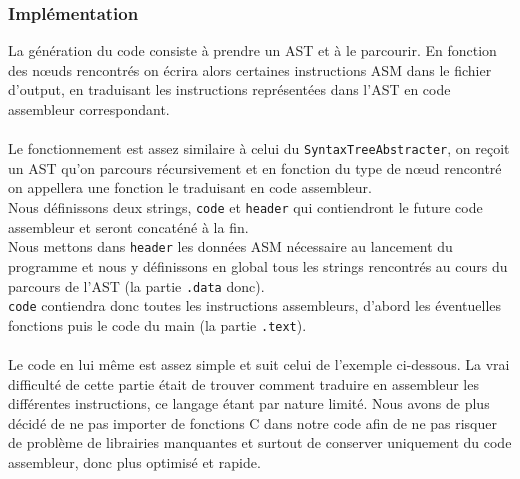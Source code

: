 \documentclass[a4paper,10pt]{article}
\begin{document}
	\subsubsection{Implémentation}
	La génération du code consiste à prendre un AST et à le parcourir. En fonction des nœuds rencontrés on écrira alors certaines instructions ASM dans le fichier d'output, en traduisant les instructions représentées dans l'AST en code assembleur correspondant.\\
	~\\
	Le fonctionnement est assez similaire à celui du \verb?SyntaxTreeAbstracter?, on reçoit un AST qu'on parcours récursivement et en fonction du type de nœud rencontré on appellera une fonction le traduisant en code assembleur.\\
	Nous définissons deux strings, \verb?code? et \verb?header? qui contiendront le future code assembleur et seront concaténé à la fin.\\
	Nous mettons dans \verb?header? les données ASM nécessaire au lancement du programme et nous y définissons en global tous les strings rencontrés au cours du parcours de l'AST (la partie \verb?.data? donc).\\
	\verb?code? contiendra donc toutes les instructions assembleurs, d'abord les éventuelles fonctions puis le code du main (la partie \verb?.text?).\\
	~\\
	Le code en lui même est assez simple et suit celui de l'exemple ci-dessous. La vrai difficulté de cette partie était de trouver comment traduire en assembleur les différentes instructions, ce langage étant par nature limité. Nous avons de plus décidé de ne pas importer de fonctions C dans notre code afin de ne pas risquer de problème de librairies manquantes et surtout de conserver uniquement du code assembleur, donc plus optimisé et rapide.\\
	
\end{document}
